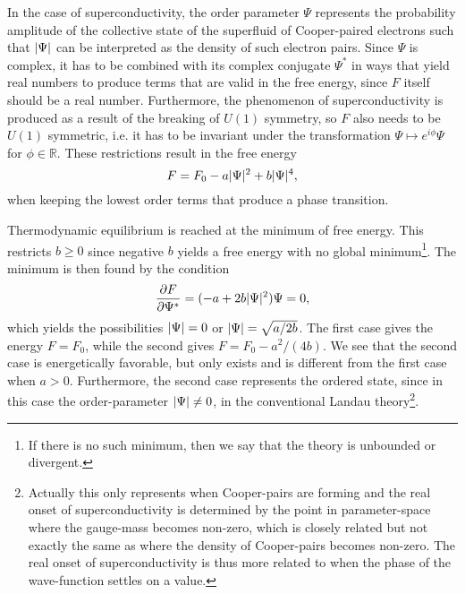 In the case of superconductivity, the order parameter $\Psi$ represents the probability amplitude of the collective
state of the superfluid of Cooper-paired electrons such that $\lvert \Psi \rvert$ can be interpreted as the density of such
electron pairs. Since $\Psi$ is complex, it has to be combined with its complex conjugate $\Psi^\ast$ in ways that
yield real numbers to produce terms that are valid in the free energy, since $F$ itself should be a real number.
Furthermore, the phenomenon of superconductivity is produced as a result of the breaking of $U(1)$ symmetry, so $F$
also needs to be $U(1)$ symmetric, i.e. it has to be invariant under the transformation $\Psi \mapsto e^{i\phi}\Psi$
for $\phi\in\mathbb{R}$. These restrictions result in the free energy
\begin{equation}
    \label{eq:statMech:LandauU1}
    F = F_0 - a\lvert \Psi \rvert^2 + b\lvert \Psi \rvert^4,
\end{equation}
when keeping the lowest order terms that produce a phase transition.

Thermodynamic equilibrium is reached at the minimum of free energy. This restricts $b\geq0$ since negative $b$ yields
a free energy with no global minimum\footnote{If there is no such minimum, then we say that the theory is unbounded or divergent.}.
The minimum is then found by the condition
\begin{equation}
    \label{eq:statMech:LandauExtreme}
    \frac{\partial F}{\partial \Psi^\ast} = (-a + 2b\lvert \Psi \rvert^2)\Psi = 0,
\end{equation}
which yields the possibilities $\lvert \Psi \rvert = 0$ or $\lvert \Psi \rvert = \sqrt{a/2b}$. The first case gives the energy $F = F_0$, while the second
gives $F = F_0 - a^2/(4b)$. We see that the second case is energetically favorable, but only exists and is different from
the first case when $a>0$. Furthermore, the second case represents the ordered state, since in this case the order-parameter $\lvert \Psi \rvert \neq 0$,
in the conventional Landau theory\footnote{Actually this only represents when Cooper-pairs are forming and the real onset
of superconductivity is determined by the point in parameter-space where the gauge-mass becomes non-zero, which is closely
related but not exactly the same as where the density of Cooper-pairs becomes non-zero. The real onset of superconductivity is
thus more related to when the phase of the wave-function settles on a value.}.

